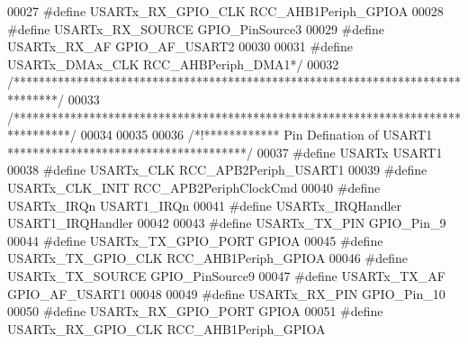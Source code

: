 \begin{DoxyCode}
00027 \textcolor{comment}{#define USARTx\_RX\_GPIO\_CLK               RCC\_AHB1Periph\_GPIOA}
00028 \textcolor{comment}{#define USARTx\_RX\_SOURCE                 GPIO\_PinSource3}
00029 \textcolor{comment}{#define USARTx\_RX\_AF                     GPIO\_AF\_USART2}
00030 \textcolor{comment}{}
00031 \textcolor{comment}{#define USARTx\_DMAx\_CLK                  RCC\_AHBPeriph\_DMA1*/}
00032 \textcolor{comment}{/*******************************************************************************/}
00033 \textcolor{comment}{/*********************************************************************************/}
00034 
00035 
00036 \textcolor{comment}{/*!************ Pin Defination of USART1 **************************************/}
00037 \textcolor{preprocessor}{#}\textcolor{preprocessor}{define} \textcolor{preprocessor}{USARTx}                           USART1
00038 \textcolor{preprocessor}{#}\textcolor{preprocessor}{define} \textcolor{preprocessor}{USARTx\_CLK}                       RCC_APB2Periph_USART1
00039 \textcolor{preprocessor}{#}\textcolor{preprocessor}{define} \textcolor{preprocessor}{USARTx\_CLK\_INIT}                  \textcolor{preprocessor}{RCC\_APB2PeriphClockCmd}
00040 \textcolor{preprocessor}{#}\textcolor{preprocessor}{define} \textcolor{preprocessor}{USARTx\_IRQn}                      \textcolor{preprocessor}{USART1\_IRQn}
00041 \textcolor{preprocessor}{#}\textcolor{preprocessor}{define} \textcolor{preprocessor}{USARTx\_IRQHandler}                \textcolor{preprocessor}{USART1\_IRQHandler}
00042 
00043 \textcolor{preprocessor}{#}\textcolor{preprocessor}{define} \textcolor{preprocessor}{USARTx\_TX\_PIN}                    GPIO_Pin_9
00044 \textcolor{preprocessor}{#}\textcolor{preprocessor}{define} \textcolor{preprocessor}{USARTx\_TX\_GPIO\_PORT}              GPIOA
00045 \textcolor{preprocessor}{#}\textcolor{preprocessor}{define} \textcolor{preprocessor}{USARTx\_TX\_GPIO\_CLK}               RCC_AHB1Periph_GPIOA
00046 \textcolor{preprocessor}{#}\textcolor{preprocessor}{define} \textcolor{preprocessor}{USARTx\_TX\_SOURCE}                 GPIO_PinSource9
00047 \textcolor{preprocessor}{#}\textcolor{preprocessor}{define} \textcolor{preprocessor}{USARTx\_TX\_AF}                     GPIO_AF_USART1
00048 
00049 \textcolor{preprocessor}{#}\textcolor{preprocessor}{define} \textcolor{preprocessor}{USARTx\_RX\_PIN}                    GPIO_Pin_10
00050 \textcolor{preprocessor}{#}\textcolor{preprocessor}{define} \textcolor{preprocessor}{USARTx\_RX\_GPIO\_PORT}              GPIOA
00051 \textcolor{preprocessor}{#}\textcolor{preprocessor}{define} \textcolor{preprocessor}{USARTx\_RX\_GPIO\_CLK}               RCC_AHB1Periph_GPIOA

\end{DoxyCode}
